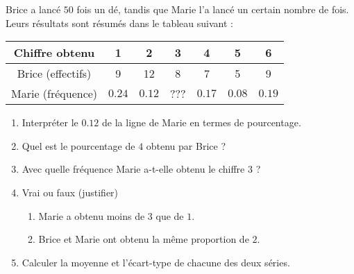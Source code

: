 
\begin{exercice}\label{exosmath-0216}

    Brice a lancé \( 50\) fois un dé, tandis que Marie l'a lancé un certain nombre de fois. Leurs résultats sont résumés dans le tableau suivant :
    \begin{center}
        \begin{tabular}[]{|c||c|c|c|c|c|c|}
            \hline
            Chiffre obtenu&1&2&3&4&5&6\\
            \hline\hline
            Brice (effectifs)&9&12&8&7&5&9\\
            \hline
            Marie (fréquence)&$0.24$&$0.12$&???&$0.17$&$0.08$&$0.19$\\
            \hline
        \end{tabular}
    \end{center}
    \begin{enumerate}
        \item
            Interpréter le \( 0.12\) de la ligne de Marie en termes de pourcentage.
            \item
                Quel est le pourcentage de $4$ obtenu par Brice ?
        \item
            Avec quelle fréquence Marie a-t-elle obtenu le chiffre \( 3\) ?
        \item
            Vrai ou faux (justifier)
            \begin{enumerate}
                \item
                    Marie a obtenu moins de \( 3\) que de \( 1\).
                \item
                    Brice et Marie ont obtenu la même proportion de \( 2\).
            \end{enumerate}
        \item
            Calculer la moyenne et l'écart-type de chacune des deux séries.
    \end{enumerate}


\end{exercice}
